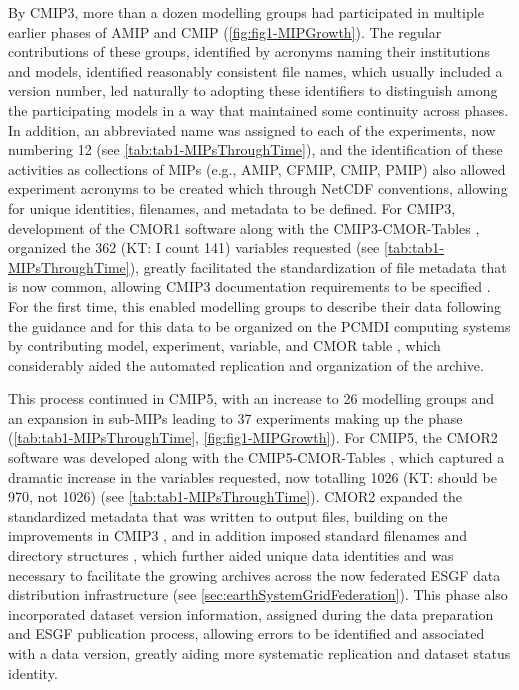 \documentclass[gmd, preprint]{copernicus}
\def\cred#1{{\color{red}#1}}
\begin{document}
By CMIP3, more than a dozen modelling groups had participated in multiple earlier phases of AMIP and CMIP (\autoref{fig:fig1-MIPGrowth}). The regular contributions of these groups, identified by acronyms naming their institutions and models, identified reasonably consistent file names, which usually included a version number, led naturally to adopting these identifiers to distinguish among the participating models in a way that maintained some continuity across phases. In addition, an abbreviated name was assigned to each of the experiments, now numbering 12 (see \autoref{tab:tab1-MIPsThroughTime}), and the identification of these activities as collections of MIPs (e.g., AMIP, CFMIP, CMIP, PMIP) also allowed experiment acronyms to be created which through NetCDF conventions, allowing for unique identities, filenames, and metadata to be defined. For CMIP3, development of the CMOR1 software \citep{taylor_cmor_2006} along with the CMIP3-CMOR-Tables \citep{doutriaux_cmip3_2005}, organized the 362 \cred{(KT: I count 141)} variables requested (see \autoref{tab:tab1-MIPsThroughTime}), greatly facilitated the standardization of file metadata that is now common, allowing CMIP3 documentation requirements to be specified \citep{taylor_pcmdi_2005}. For the first time, this enabled modelling groups to describe their data following the guidance and for this data to be organized on the PCMDI computing systems by contributing model, experiment, variable, and CMOR table \citep{doutriaux_cmip3_2005}, which considerably aided the automated replication and organization of the archive.

This process continued in CMIP5, with an increase to 26 modelling groups and an expansion in sub-MIPs leading to 37 experiments making up the phase (\autoref{tab:tab1-MIPsThroughTime}, \autoref{fig:fig1-MIPGrowth}).  For CMIP5, the CMOR2 software was developed \citep{doutriaux_cmor_2011} along with the CMIP5-CMOR-Tables \citep{doutriaux_cmip5_2013}, which captured a dramatic increase in the variables requested, now totalling 1026 \cred{(KT: should be 970, not 1026)} (see \autoref{tab:tab1-MIPsThroughTime}). CMOR2 expanded the standardized metadata that was written to output files, building on the improvements in CMIP3 \citep{taylor_pcmdi_2010}, and in addition imposed standard filenames and directory structures \citep{taylor_pcmdi_2012}, which further aided unique data identities and was necessary to facilitate the growing archives across the now federated ESGF data distribution infrastructure (see \autoref{sec:earthSystemGridFederation}). This phase also incorporated dataset version information, assigned during the data preparation and ESGF publication process, allowing errors to be identified and associated with a data version, greatly aiding more systematic replication and dataset status identity. 
\end{document}
